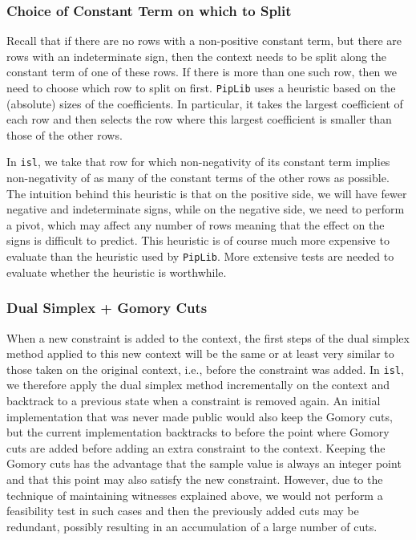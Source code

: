 \subsubsection{Choice of Constant Term on which to Split}

Recall that if there are no rows with a non-positive constant term,
but there are rows with an indeterminate sign, then the context
needs to be split along the constant term of one of these rows.
If there is more than one such row, then we need to choose which row
to split on first.  {\tt PipLib} uses a heuristic based on the (absolute)
sizes of the coefficients.  In particular, it takes the largest coefficient
of each row and then selects the row where this largest coefficient is smaller
than those of the other rows.

In {\tt isl}, we take that row for which non-negativity of its constant
term implies non-negativity of as many of the constant terms of the other
rows as possible.  The intuition behind this heuristic is that on the
positive side, we will have fewer negative and indeterminate signs,
while on the negative side, we need to perform a pivot, which may
affect any number of rows meaning that the effect on the signs
is difficult to predict.  This heuristic is of course much more
expensive to evaluate than the heuristic used by {\tt PipLib}.
More extensive tests are needed to evaluate whether the heuristic is worthwhile.

\subsubsection{Dual Simplex + Gomory Cuts}

When a new constraint is added to the context, the first steps
of the dual simplex method applied to this new context will be the same
or at least very similar to those taken on the original context, i.e.,
before the constraint was added.  In {\tt isl}, we therefore apply
the dual simplex method incrementally on the context and backtrack
to a previous state when a constraint is removed again.
An initial implementation that was never made public would also
keep the Gomory cuts, but the current implementation backtracks
to before the point where Gomory cuts are added before adding
an extra constraint to the context.
Keeping the Gomory cuts has the advantage that the sample value
is always an integer point and that this point may also satisfy
the new constraint.  However, due to the technique of maintaining
witnesses explained above,
we would not perform a feasibility test in such cases and then
the previously added cuts may be redundant, possibly resulting
in an accumulation of a large number of cuts.

